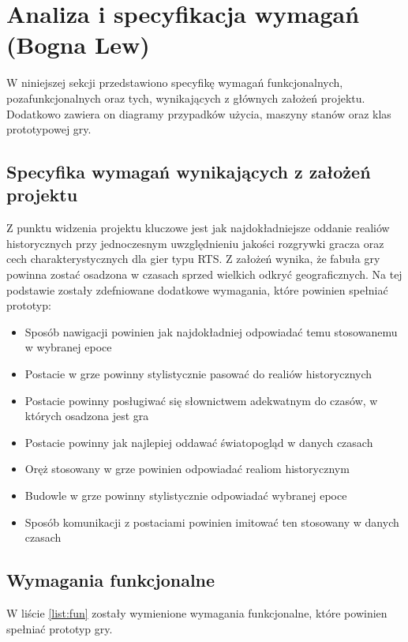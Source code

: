 \section{Analiza i specyfikacja wymagań (Bogna Lew)}
W niniejszej sekcji przedstawiono specyfikę wymagań funkcjonalnych, pozafunkcjonalnych oraz tych, wynikających z
głównych założeń projektu. Dodatkowo zawiera on diagramy przypadków użycia, maszyny stanów oraz klas prototypowej gry.

\subsection{Specyfika wymagań wynikających z założeń projektu}
Z punktu widzenia projektu kluczowe jest jak najdokładniejsze oddanie realiów historycznych przy jednoczesnym
uwzględnieniu jakości rozgrywki gracza oraz cech charakterystycznych dla gier typu RTS. Z założeń wynika, że fabuła
gry powinna zostać osadzona w czasach sprzed wielkich odkryć geograficznych. Na tej podstawie zostały zdefniowane
dodatkowe wymagania, które powinien spełniać prototyp:
\begin{itemize}
  \item Sposób nawigacji powinien jak najdokładniej odpowiadać temu stosowanemu w wybranej epoce
  \item Postacie w grze powinny stylistycznie pasować do realiów historycznych
  \item Postacie powinny posługiwać się słownictwem adekwatnym do czasów, w których osadzona jest gra
  \item Postacie powinny jak najlepiej oddawać światopogląd w danych czasach
  \item Oręż stosowany w grze powinien odpowiadać realiom historycznym
  \item Budowle w grze powinny stylistycznie odpowiadać wybranej epoce
  \item Sposób komunikacji z postaciami powinien imitować ten stosowany w danych czasach
\end{itemize}

\subsection{Wymagania funkcjonalne}\label{ss:fun}
W liście \ref{list:fun} zostały wymienione wymagania funkcjonalne, które powinien spełniać prototyp gry.

